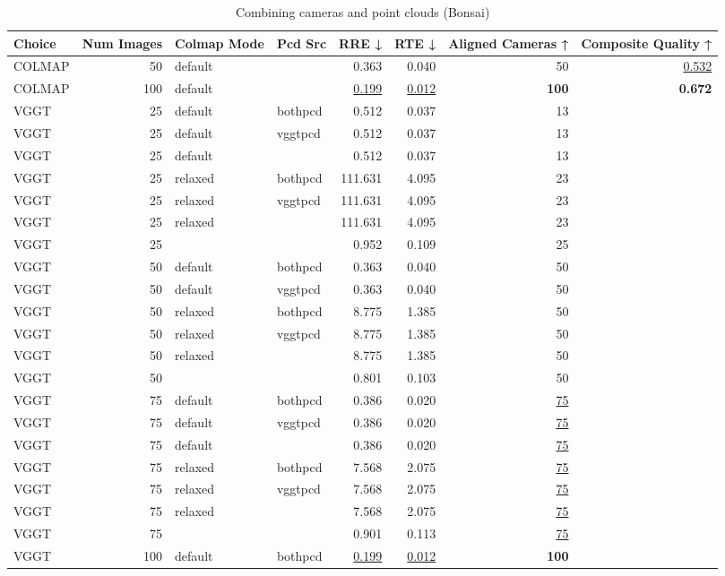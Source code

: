 \begin{table}[H]
\caption{Combining cameras and point clouds (Bonsai)}
\label{tab:07_combined_align_relaxed_bonsai}
\begin{tabular}{lrllrrrr}
\toprule
Choice & Num Images & Colmap Mode & Pcd Src & RRE ↓ & RTE ↓ & Aligned Cameras ↑ & Composite Quality ↑ \\
\midrule
COLMAP & 50 & default &  & 0.363 & 0.040 & 50 & \underline{0.532} \\
COLMAP & 100 & default &  & \underline{0.199} & \underline{0.012} & \textbf{100} & \textbf{0.672} \\
VGGT & 25 & default & bothpcd & 0.512 & 0.037 & 13 &  \\
VGGT & 25 & default & vggtpcd & 0.512 & 0.037 & 13 &  \\
VGGT & 25 & default &  & 0.512 & 0.037 & 13 &  \\
VGGT & 25 & relaxed & bothpcd & 111.631 & 4.095 & 23 &  \\
VGGT & 25 & relaxed & vggtpcd & 111.631 & 4.095 & 23 &  \\
VGGT & 25 & relaxed &  & 111.631 & 4.095 & 23 &  \\
VGGT & 25 &  &  & 0.952 & 0.109 & 25 &  \\
VGGT & 50 & default & bothpcd & 0.363 & 0.040 & 50 &  \\
VGGT & 50 & default & vggtpcd & 0.363 & 0.040 & 50 &  \\
VGGT & 50 & relaxed & bothpcd & 8.775 & 1.385 & 50 &  \\
VGGT & 50 & relaxed & vggtpcd & 8.775 & 1.385 & 50 &  \\
VGGT & 50 & relaxed &  & 8.775 & 1.385 & 50 &  \\
VGGT & 50 &  &  & 0.801 & 0.103 & 50 &  \\
VGGT & 75 & default & bothpcd & 0.386 & 0.020 & \underline{75} &  \\
VGGT & 75 & default & vggtpcd & 0.386 & 0.020 & \underline{75} &  \\
VGGT & 75 & default &  & 0.386 & 0.020 & \underline{75} &  \\
VGGT & 75 & relaxed & bothpcd & 7.568 & 2.075 & \underline{75} &  \\
VGGT & 75 & relaxed & vggtpcd & 7.568 & 2.075 & \underline{75} &  \\
VGGT & 75 & relaxed &  & 7.568 & 2.075 & \underline{75} &  \\
VGGT & 75 &  &  & 0.901 & 0.113 & \underline{75} &  \\
VGGT & 100 & default & bothpcd & \underline{0.199} & \underline{0.012} & \textbf{100} &  \\

\end{tabular}
\end{table}
